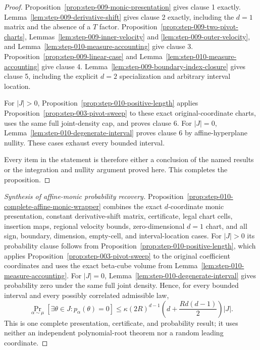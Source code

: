 \begin{proof}
Proposition~\ref{prop:step-009-monic-presentation} gives clause 1 exactly. Lemma~\ref{lem:step-009-derivative-shift} gives clause 2 exactly, including the \(d=1\) matrix and the absence of a \(T\) factor. Proposition~\ref{prop:step-009-two-pivot-charts}, Lemmas~\ref{lem:step-009-inner-velocity} and \ref{lem:step-009-outer-velocity}, and Lemma~\ref{lem:step-010-measure-accounting} give clause 3. Proposition~\ref{prop:step-009-linear-case} and Lemma~\ref{lem:step-010-measure-accounting} give clause 4. Lemma~\ref{lem:step-009-boundary-index-closure} gives clause 5, including the explicit \(d=2\) specialization and arbitrary interval location.

For \(\lvert J\rvert>0\), Proposition~\ref{prop:step-010-positive-length} applies Proposition~\ref{prop:step-003-pivot-sweep} to these exact original-coordinate charts, uses the same full joint-density cap, and proves clause 6. For \(\lvert J\rvert=0\), Lemma~\ref{lem:step-010-degenerate-interval} proves clause 6 by affine-hyperplane nullity. These cases exhaust every bounded interval.

Every item in the statement is therefore either a conclusion of the named
results or the integration and nullity argument proved here. This completes
the proposition. 
\end{proof}


\begin{proof}[Synthesis of affine-monic probability recovery]
Proposition~\ref{prop:step-010-complete-affine-monic-wrapper} combines the
exact $d$-coordinate monic presentation, constant derivative-shift matrix,
certificate, legal chart cells, insertion maps, regional velocity bounds,
zero-dimensional $d=1$ chart, and all sign, boundary, dimension, empty-cell,
and interval-location cases.  For $|J|>0$ its probability clause follows
from Proposition~\ref{prop:step-010-positive-length}, which applies
Proposition~\ref{prop:step-003-pivot-sweep} to the original coefficient
coordinates and uses the exact beta-cube volume from
Lemma~\ref{lem:step-010-measure-accounting}.  For $|J|=0$,
Lemma~\ref{lem:step-010-degenerate-interval} gives probability zero under
the same full joint density.  Hence, for every bounded interval and every
possibly correlated admissible law,
\begin{equation}
\label{eq:appendix-display-335}
\Pr_{\alpha\sim\mu}[\exists\theta\in J:p_\alpha(\theta)=0]
\leq\kappa(2R)^{d-1}
\left(d+\frac{Rd(d-1)}2\right)|J|.
\end{equation}
This is one complete presentation, certificate, and probability result;
it uses neither an independent polynomial-root theorem nor a random leading
coordinate.
\end{proof}



